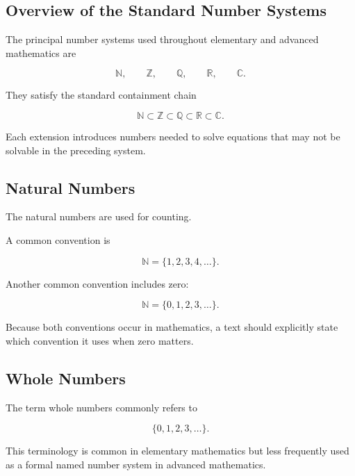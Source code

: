 \subsection{Overview of the Standard Number Systems}
\label{subsec:number-systems-overview}

The principal number systems used throughout elementary and advanced
mathematics are

\[
\boxed{
\mathbb{N},
\qquad
\mathbb{Z},
\qquad
\mathbb{Q},
\qquad
\mathbb{R},
\qquad
\mathbb{C}.
}
\]

They satisfy the standard containment chain

\[
\boxed{
\mathbb{N}
\subset
\mathbb{Z}
\subset
\mathbb{Q}
\subset
\mathbb{R}
\subset
\mathbb{C}.
}
\]

Each extension introduces numbers needed to solve equations that may not be
solvable in the preceding system.

\subsection{Natural Numbers}
\label{subsec:natural-numbers-reference}

The natural numbers are used for counting.

A common convention is

\[
\boxed{
\mathbb{N}
=
\{1,2,3,4,\ldots\}.
}
\]

Another common convention includes zero:

\[
\boxed{
\mathbb{N}
=
\{0,1,2,3,\ldots\}.
}
\]

Because both conventions occur in mathematics, a text should explicitly state
which convention it uses when zero matters.

\subsection{Whole Numbers}
\label{subsec:whole-numbers-reference}

The term whole numbers commonly refers to

\[
\boxed{
\{0,1,2,3,\ldots\}.
}
\]

This terminology is common in elementary mathematics but less frequently used
as a formal named number system in advanced mathematics.

